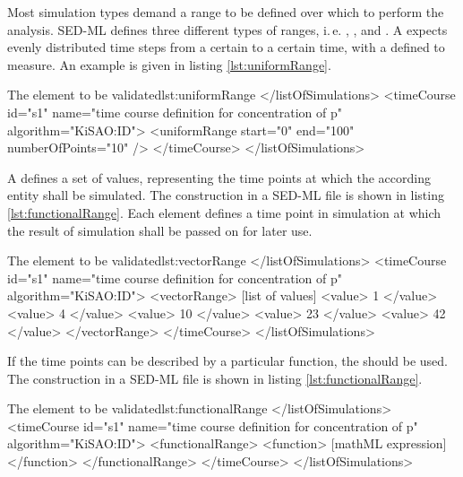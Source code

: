 \label{sec:range}
Most simulation types demand a range to be defined over which to perform the analysis. SED-ML defines three different types of ranges, i.\,e. , , and .
A  expects evenly distributed time steps from a certain  to a certain  time, with a defined  to measure. An example is given in listing \ref{lst:uniformRange}. %
\begin{myXmlLst}{The  element \alert{to be validated}}{lst:uniformRange}
</listOfSimulations>
 <timeCourse id="s1" name="time course definition for concentration of p" algorithm="KiSAO:ID">
  <uniformRange start="0" end="100" numberOfPoints="10" />
 </timeCourse>
</listOfSimulations>
\end{myXmlLst}


A  defines a set of values, representing the time points at which the according entity shall be simulated. %
The construction in a SED-ML file is shown in listing \ref{lst:functionalRange}. Each  element defines a time point in simulation at which the result of simulation shall be passed on for later use.
%
\begin{myXmlLst}{The  element \alert{to be validated}}{lst:vectorRange}
</listOfSimulations>
 <timeCourse id="s1" name="time course definition for concentration of p" algorithm="KiSAO:ID">
  <vectorRange>
   [list of values]
   <value> 1  </value>
   <value> 4  </value>  
   <value> 10 </value>
   <value> 23 </value>
   <value> 42 </value>
  </vectorRange>
 </timeCourse>
</listOfSimulations>
\end{myXmlLst}

If the time points can be described by a particular function, the  should be used. The construction in a SED-ML file is shown in listing \ref{lst:functionalRange}.
\begin{myXmlLst}{The  element \alert{to be validated}}{lst:functionalRange}
</listOfSimulations>
 <timeCourse id="s1" name="time course definition for concentration of p" algorithm="KiSAO:ID">
  <functionalRange>
   <function>
    [mathML expression]
   </function>
  </functionalRange>
 </timeCourse>
</listOfSimulations>
\end{myXmlLst}
